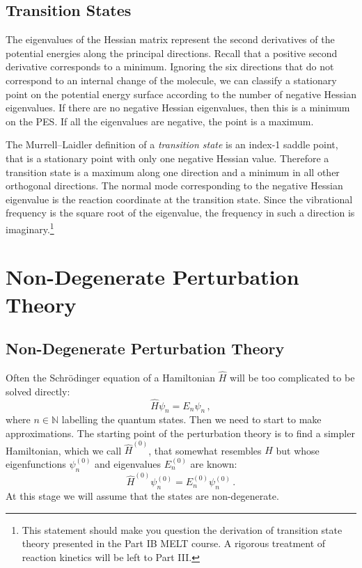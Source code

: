 \documentclass{article}
\theoremstyle{plain}\theoremheaderfont{\normalfont\itshape}\theorembodyfont{\rmfamily}\theoremseparator{.}\newtheorem*{rem}{Remark}\newtheorem*{ex}{Example}\newtheorem*{proof}{Proof}\newtheorem*{altp}{Alternative proof}
\theoremstyle{plain}\theoremheaderfont{\normalfont\bfseries}\theorembodyfont{\rmfamily}\theoremseparator{.}\newtheorem{thm}{Theorem}[section]\newtheorem{lem}[thm]{Lemma}\newtheorem{prop}[thm]{Proposition}\newtheorem*{cor}{Corollary}\newtheorem{defn}[thm]{Definition}\newtheorem{clm}[thm]{Claim}\newtheorem{clminproof}{Claim}
\theoremstyle{break}\theoremheaderfont{\normalfont\itshape}\theorembodyfont{\rmfamily}\theoremseparator{.\medskip}\newtheorem*{proofskip}{Proof}\newtheorem*{exs}{Examples}\newtheorem*{rems}{Remarks}
\theoremstyle{break}\theoremheaderfont{\normalfont\bfseries}\theorembodyfont{\rmfamily}\theoremseparator{.\medskip}\newtheorem{lemskip}[thm]{Lemma}\newtheorem{defnskip}[thm]{Definition}\newtheorem{propskip}[thm]{Proposition}\newtheorem{thmskip}[thm]{Theorem}
\numberwithin{equation}{section}
\newcommand{\NN}{\mathbb{N}}
\begin{document}
    \subsection{Transition States}
    The eigenvalues of the Hessian matrix represent the second derivatives of the potential energies along the principal directions. Recall that a positive second derivative corresponds to a minimum. Ignoring the six directions that do not correspond to an internal change of the molecule, we can classify a stationary point on the potential energy surface according to the number of negative Hessian eigenvalues. If there are no negative Hessian eigenvalues, then this is a minimum on the PES. If all the eigenvalues are negative, the point is a maximum.

    The Murrell--Laidler definition of a \textit{transition state} is an index-1 saddle point, that is a stationary point with only one negative Hessian value. Therefore a transition state is a maximum along one direction and a minimum in all other orthogonal directions. The normal mode corresponding to the negative Hessian eigenvalue is the reaction coordinate at the transition state. Since the vibrational frequency is the square root of the eigenvalue, the frequency in such a direction is imaginary.\footnote{This statement should make you question the derivation of transition state theory presented in the Part IB MELT course. A rigorous treatment of reaction kinetics will be left to Part III.}

    \newpage

    \section{Non-Degenerate Perturbation Theory}
    \subsection{Non-Degenerate Perturbation Theory}
    Often the Schr\"{o}dinger equation of a Hamiltonian \(\hat{H}\) will be too complicated to be solved directly:
    \begin{equation}\label{Schrodinger_eqn}
        \hat{H}\psi_n=E_n\psi_n\,,
    \end{equation}
    where \(n\in\NN\) labelling the quantum states. Then we need to start to make approximations. The starting point of the perturbation theory is to find a simpler Hamiltonian, which we call \(\hat{H}^{(0)}\), that somewhat resembles \(H\) but whose eigenfunctions \(\psi_n^{(0)}\) and eigenvalues \(E_n^{(0)}\) are known:
    \begin{equation}\label{unperturbed_Schrodinger}
        \hat{H}^{(0)}\psi_n^{(0)}=E_n^{(0)}\psi_n^{(0)}\,.
    \end{equation}
    At this stage we will assume that the states are non-degenerate.
\end{document}
